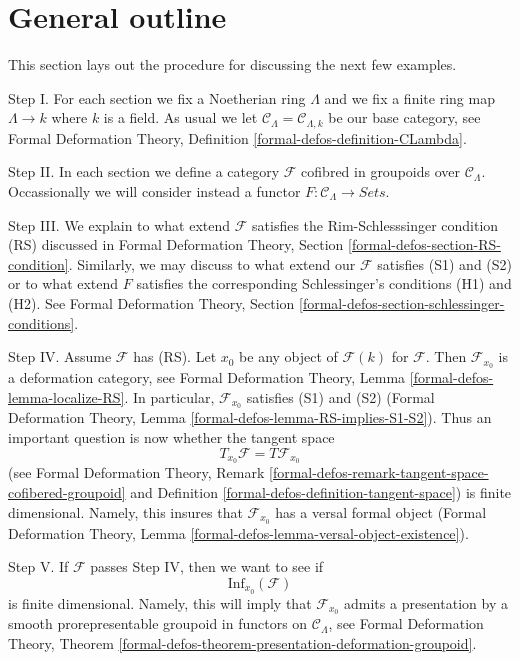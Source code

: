 \section{General outline}
\label{section-general}

\noindent
This section lays out the procedure for discussing the next few examples.

\medskip\noindent
Step I. For each section we fix a Noetherian ring $\Lambda$ and
we fix a finite ring map $\Lambda \to k$ where $k$ is a field.
As usual we let $\mathcal{C}_\Lambda = \mathcal{C}_{\Lambda, k}$
be our base category, see
Formal Deformation Theory,
Definition \ref{formal-defos-definition-CLambda}.

\medskip\noindent
Step II. In each section we define a category $\mathcal{F}$
cofibred in groupoids over $\mathcal{C}_\Lambda$. Occassionally
we will consider instead a functor
$F : \mathcal{C}_\Lambda \to \textit{Sets}$.

\medskip\noindent
Step III. We explain to what extend $\mathcal{F}$ satisfies
the Rim-Schlesssinger condition (RS) discussed in
Formal Deformation Theory, Section \ref{formal-defos-section-RS-condition}.
Similarly, we may discuss to what extend our $\mathcal{F}$
satisfies (S1) and (S2) or to what extend $F$ satisfies
the corresponding Schlessinger's conditions (H1) and (H2).
See Formal Deformation Theory, Section
\ref{formal-defos-section-schlessinger-conditions}.

\medskip\noindent
Step IV. Assume $\mathcal{F}$ has (RS).
Let $x_0$ be any object of $\mathcal{F}(k)$
for $\mathcal{F}$. Then $\mathcal{F}_{x_0}$ is
a deformation category, see
Formal Deformation Theory, Lemma
\ref{formal-defos-lemma-localize-RS}.
In particular, $\mathcal{F}_{x_0}$ satisfies (S1) and (S2)
(Formal Deformation Theory, Lemma
\ref{formal-defos-lemma-RS-implies-S1-S2}).
Thus an important question is now whether the tangent space
$$
T_{x_0}\mathcal{F} = T\mathcal{F}_{x_0}
$$
(see Formal Deformation Theory, Remark
\ref{formal-defos-remark-tangent-space-cofibered-groupoid} and
Definition \ref{formal-defos-definition-tangent-space})
is finite dimensional. Namely, this insures that
$\mathcal{F}_{x_0}$ has a versal formal object
(Formal Deformation Theory, Lemma
\ref{formal-defos-lemma-versal-object-existence}).

\medskip\noindent
Step V. If $\mathcal{F}$ passes Step IV, then we want to see if
$$
\text{Inf}_{x_0}(\mathcal{F})
$$
is finite dimensional. Namely, this will imply that
$\mathcal{F}_{x_0}$ admits a presentation by a
smooth prorepresentable groupoid in functors on $\mathcal{C}_\Lambda$, see
Formal Deformation Theory, Theorem
\ref{formal-defos-theorem-presentation-deformation-groupoid}.




